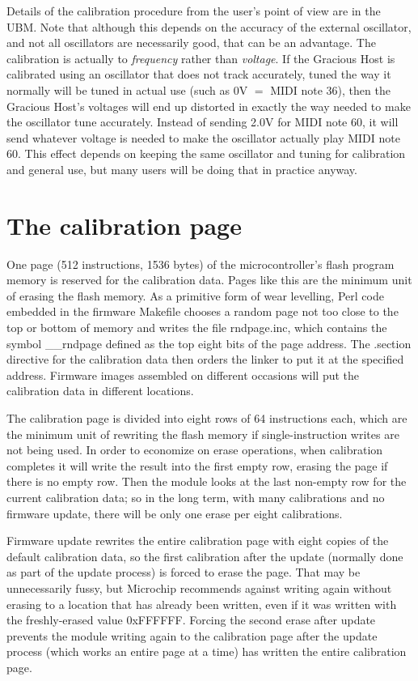 Details of the calibration procedure from the user's point of view are in
the UBM.  Note that although this depends on the accuracy of the external
oscillator, and not all oscillators are necessarily good, that can be an
advantage.  The calibration is actually to \emph{frequency} rather than
\emph{voltage}.  If the Gracious Host is calibrated using an oscillator that
does not track accurately, tuned the way it normally will be tuned in actual
use (such as 0V $=$ MIDI note 36), then the Gracious Host's voltages will
end up distorted in exactly the way needed to make the oscillator tune
accurately.  Instead of sending 2.0V for MIDI note 60, it will send whatever
voltage is needed to make the oscillator actually play MIDI note 60.  This
effect depends on keeping the same oscillator and tuning for calibration and
general use, but many users will be doing that in practice anyway.

\section{The calibration page}

One page (512 instructions, 1536 bytes) of the microcontroller's flash
program memory is reserved for the calibration data.  Pages like this are
the minimum unit of erasing the flash memory.  As a primitive form of wear
levelling, Perl code embedded in the firmware Makefile chooses a random page
not too close to the top or bottom of memory and writes the file
rndpage.inc, which contains the symbol \_\_rndpage defined as the top eight
bits of the page address.  The .section directive for the calibration data
then orders the linker to put it at the specified address.  Firmware images
assembled on different occasions will put the calibration data in different
locations.

The calibration page is divided into eight rows of 64 instructions each,
which are the minimum unit of rewriting the flash memory if
single-instruction writes are not being used.  In order to economize on
erase operations, when calibration completes it will write the result into
the first empty row, erasing the page if there is no empty row.  Then the
module looks at the last non-empty row for the current calibration data; so
in the long term, with many calibrations and no firmware update, there will
be only one erase per eight calibrations.

Firmware update rewrites the entire calibration page with eight copies of
the default calibration data, so the first calibration after the update
(normally done as part of the update process) is forced to erase the page. 
That may be unnecessarily fussy, but Microchip recommends against writing
again without erasing to a location that has already been written, even if
it was written with the freshly-erased value 0xFFFFFF.  Forcing the second
erase after update prevents the module writing again to the calibration page
after the update process (which works an entire page at a time) has written
the entire calibration page.


